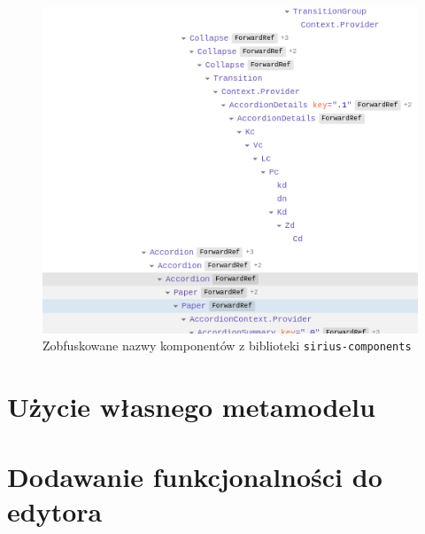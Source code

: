 \begin{figure}[!hb]
  \centering

  \includegraphics[width=0.7\linewidth]{./images/sirius-web-minified-component-names.png}
  \caption{Zobfuskowane nazwy komponentów z biblioteki
    \texttt{sirius-components}}\label{rys:sirius-web-minified-component-names}
\end{figure}

\section{Użycie własnego metamodelu}


\section{Dodawanie funkcjonalności do edytora}

